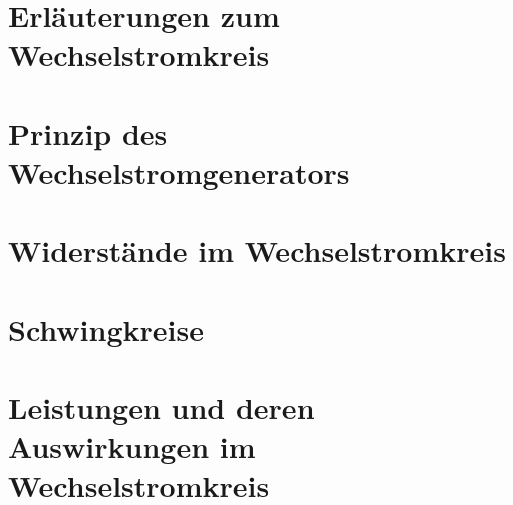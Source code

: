 \section{Erläuterungen zum Wechselstromkreis}				\label{sec:Erlaeuterungen}




\section{Prinzip des Wechselstromgenerators}				\label{sec:Generator}




\section{Widerstände im Wechselstromkreis}					\label{sec:Widerstaende}




\section{Schwingkreise}										\label{sec:Schwingkreise}




\section[Leistungen im Wechselstromkreis]{Leistungen und deren Auswirkungen im Wechselstromkreis}	\label{sec:Leistungen}

